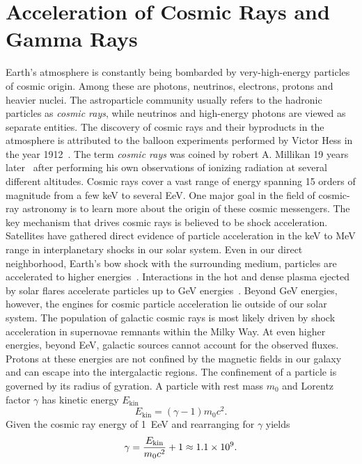 \chapter{Acceleration of Cosmic Rays and Gamma Rays}
\label{ch:theory}
Earth's atmosphere is constantly being bombarded by very-high-energy particles of cosmic origin.
Among these are photons, neutrinos, electrons, protons and heavier nuclei.
The astroparticle community usually refers to the hadronic particles as \emph{cosmic rays}, while neutrinos and high-energy photons
are viewed as separate entities.
The discovery of cosmic rays and their byproducts in the atmosphere is attributed to the balloon experiments performed by Victor
Hess in the year 1912~\cite{hess_original, hess_nytimes}.
The term \emph{cosmic rays} was coined by robert A. Millikan 19 years later~\cite{millikan} after performing his own
observations of ionizing radiation at several different altitudes.
Cosmic rays cover a vast range of energy spanning 15 orders of magnitude from a few \si{\kilo\eV} to several \si{EeV}.
One major goal in the field of cosmic-ray astronomy is to learn more about the origin of these cosmic messengers.
The key mechanism that drives cosmic rays is believed to be shock acceleration.
Satellites have gathered direct evidence of particle
acceleration in the \si{\kilo\eV} to \si{\mega\eV} range in interplanetary shocks in our solar system.
Even in our direct neighborhood, Earth's bow shock with the surrounding medium, particles are accelerated to higher energies~\cite{bow_shock}.
Interactions in the hot and dense plasma ejected by solar flares accelerate particles up to \si{GeV} energies~\cite[236]{gaisser}.
Beyond \si{\giga\eV} energies, however, the engines for cosmic particle acceleration lie outside of our solar system.
The population of galactic cosmic rays is most likely driven by shock acceleration in supernovae remnants
within the Milky Way.
At even higher energies, beyond \si{EeV}, galactic sources cannot account for the observed fluxes. Protons at these energies
are not confined by the magnetic fields in our galaxy and can escape into the intergalactic regions.
The confinement of a particle is governed by its radius of gyration.   
A particle with rest mass $m_0$ and Lorentz factor $\gamma$ has kinetic energy $E_{\text{kin}}$
\begin{equation*}
  E_{\text{kin}} = (\gamma - 1) m_0 c^2.
\end{equation*}
Given the cosmic ray energy of \SI{1}{EeV} and rearranging for $\gamma$ yields
\begin{equation*}
  \gamma = \frac{E_{\text{kin}}}{ m_0 c^2}  +  1 \approx \num{1.1E9}.
\end{equation*}
